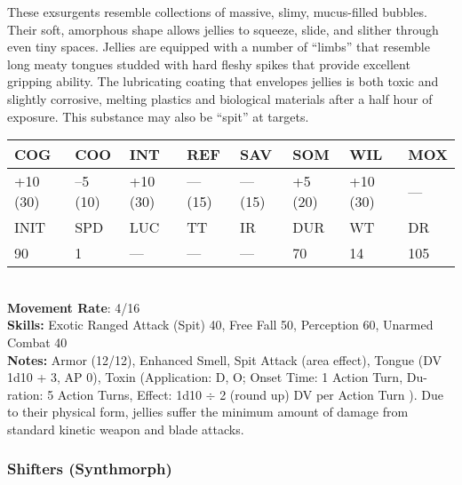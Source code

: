 These exsurgents resemble collections of massive, slimy, mucus-filled bubbles. Their soft, amorphous shape allows jellies to squeeze, slide, and slither through even tiny spaces. Jellies are equipped with a number of ``limbs'' that resemble long meaty tongues studded with hard fleshy spikes that provide excellent gripping ability. The lubricating coating that envelopes jellies is both toxic and slightly corrosive, melting plastics and biological materials after a half hour of exposure. This substance may also be ``spit'' at targets.\\ \begin{tabular}{|l|l|l|l|l|l|l|l|} \hline

COG &COO &INT &REF &SAV &SOM &WIL &MOX \\ \hline

+10 (30) &–5 (10) &+10 (30) &— (15) &— (15) &+5 (20) &+10 (30) &— \\ \hline

INIT &SPD &LUC &TT &IR &DUR &WT &DR \\ \hline

90 &1 &— &— &— &70 &14 &105 \\ \hline

\end{tabular} \\ \textbf{Movement Rate}: 4/16 \\ \textbf{Skills:} Exotic Ranged Attack (Spit) 40, Free Fall 50, Perception 60, Unarmed Combat 40 \\ \textbf{Notes:} Armor (12/12), Enhanced Smell, Spit Attack (area effect), Tongue (DV 1d10 + 3, AP 0), Toxin (Application: D, O; Onset Time: 1 Action Turn, Du- ration: 5 Action Turns, Effect: 1d10 $\div$ 2 (round up) DV per Action Turn ). Due to their physical form, jellies suffer the minimum amount of damage from standard kinetic weapon and blade attacks. 

\subsubsection{Shifters (Synthmorph)} 

